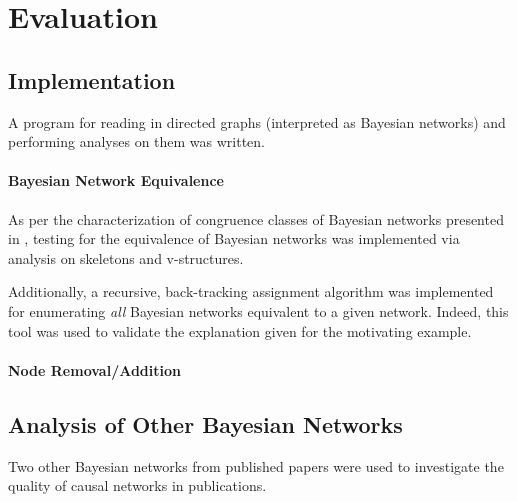 \documentclass{article}
\begin{document}
	
	
	
	
	
	\section{Evaluation}
	\label{evaluation}
	
	\subsection{Implementation}
	
	A program for reading in directed graphs (interpreted as Bayesian networks) and performing analyses on them was written.
	
	\paragraph{Bayesian Network Equivalence}
	As per the characterization of congruence classes of Bayesian networks presented in \cite{verma2013equivalence,chickering2013transformational}, testing for the equivalence of Bayesian networks was implemented via analysis on skeletons and v-structures.
	
	Additionally, a recursive, back-tracking assignment algorithm was implemented for enumerating \emph{all} Bayesian networks equivalent to a given network.
	Indeed, this tool was used to validate the explanation given for the motivating example.
	
	\paragraph{Node Removal/Addition}
	
	
	
	\subsection{Analysis of Other Bayesian Networks}
	
	Two other Bayesian networks from published papers were used to investigate the quality of causal networks in publications. \cite{Xu2018} \cite{liverDisorders}
	
\end{document}
